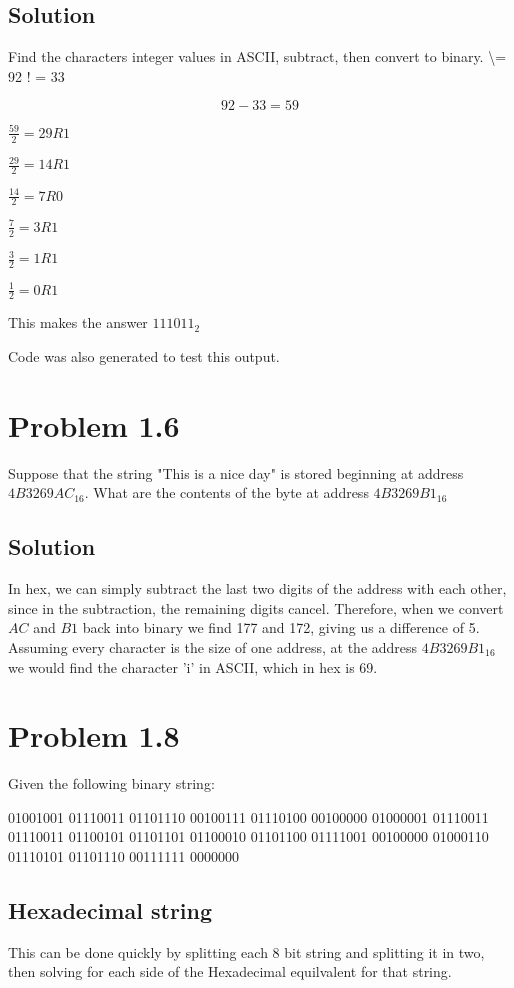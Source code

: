 \documentclass[letterpaper,11pt]{texMemo} %
\begin{document}
\subsection*{Solution}
Find the characters integer values in ASCII, subtract, then convert to binary.
\textbackslash = 92
! = 33

\[
    92 - 33 = 59
\]

$\frac{59}{2} = 29 R 1$

$\frac{29}{2} = 14 R 1$

$\frac{14}{2} = 7 R 0$

$\frac{7}{2} = 3 R 1$

$\frac{3}{2} = 1 R 1$

$\frac{1}{2} = 0 R 1$

This makes the answer $111011_2$

Code was also generated to test this output.



\newpage
\section*{Problem 1.6}
Suppose that the string "This is a nice day" is stored beginning at address 
$4B3269AC_{16}$. What are the contents of the byte at address $4B3269B1_{16}$

\subsection*{Solution}
In hex, we can simply subtract the last two digits of the address with each other, since in the subtraction,
the remaining digits cancel. Therefore, when we convert $AC$ and $B1$ back into binary we find 
177 and 172, giving us a difference of 5. Assuming every character is the size of one address,
at the address $4B3269B1_{16}$ we would find the character 'i' in ASCII, which in hex is 69.

\section*{Problem 1.8}
Given the following binary string:

01001001 01110011 01101110 00100111 01110100 00100000 01000001 01110011 01110011 01100101 01101101 01100010
01101100 01111001 00100000 01000110 01110101 01101110 00111111 0000000

\subsection*{Hexadecimal string}
This can be done quickly by splitting each 8 bit string and splitting it in two, then solving for each side of
the Hexadecimal equilvalent for that string.
\end{document}
